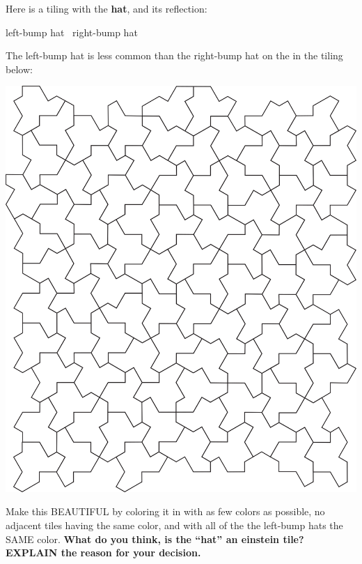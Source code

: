 \documentclass[noauthor,nooutcomes,handout,hints,12pt]{ximera}
\begin{document}
\begin{question}
  Here is a tiling with the \textbf{hat}, and its reflection:
  \begin{center}
    left-bump hat~ right-bump hat
  \end{center}
  The left-bump hat is less common than the right-bump hat on the in
  the tiling below:
  \begin{center}
    \includegraphics[scale=.8]{hat.png}
  \end{center}
  Make this BEAUTIFUL by coloring it in with as few colors as possible, no adjacent tiles having the same color, and with all of the the
  left-bump hats the SAME color. \textbf{What do you think, is the ``hat'' an einstein tile? EXPLAIN the reason for your decision.}
\end{question}
\end{document}
